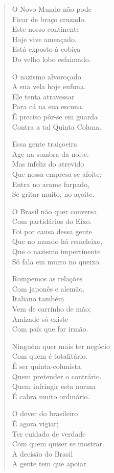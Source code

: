 \begin{verse}
O Novo Mundo não pode\\
Ficar de braço cruzado.\\
Este nosso continente\\
Hoje vive ameaçado.\\
Está exposto à cobiça\\
Do velho lobo esfaimado.

O nazismo alvoroçado\\
A sua vela hoje enfuna.\\
Ele tenta atravessar\\
Para cá na sua escuna.\\
É preciso pôr-se em guarda\\
Contra a tal Quinta Coluna.

Essa gente traiçoeira\\
Age na sombra da noite.\\
Mas infeliz do atrevido\\
Que nessa empresa se afoite:\\
Entra no arame farpado,\\
Se gritar muito, no açoite.

O Brasil não quer conversa\\
Com partidários do Eixo.\\
Foi por causa dessa gente\\
Que no mundo há remeleixo,\\
Que o nazismo impertinente\\
Só fala em murro no queixo.
\pagebreak

Rompemos as relações\\
Com japonês e alemão.\\
Italiano também\\
Vem de carrinho de mão;\\
Amizade só existe\\
Com país que for irmão.

Ninguém quer mais ter negócio\\
Com quem é totalitário.\\
É ser quinta-colunista\\
Quem pretender o contrário.\\
Quem infringir esta norma\\
É cabra muito ordinário.

O dever do brasileiro\\
É agora vigiar;\\
Ter cuidado de verdade\\
Com quem quiser se mostrar.\\
A decisão do Brasil\\
A gente tem que apoiar.


\end{verse}
